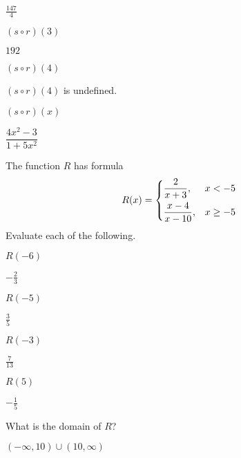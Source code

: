 \begin{exercises}
\begin{problem}[Composition]
\begin{multicols}{3}
\begin{subproblem}
\begin{shortsolution}
			$\frac{147}{4}$ 
		\end{shortsolution}
	\end{subproblem}
	\begin{subproblem}
		$(s\circ r)(3)$ 
		\begin{shortsolution}
			$192$ 
		\end{shortsolution}
	\end{subproblem}
	\begin{subproblem}
		$(s\circ r)(4)$ 
		\begin{shortsolution}
			$(s\circ r)(4)$ is undefined.
		\end{shortsolution}
	\end{subproblem}
	\begin{subproblem}
		$(s\circ r)(x)$ 
		\begin{shortsolution}
			$\dfrac{4x^2-3}{1+5x^2}$
		\end{shortsolution}
	\end{subproblem}
\end{multicols}
\end{problem}
\begin{problem}
The function $R$ has formula
\[
	R(x)=
	\begin{dcases}
		\frac{2}{x+3},    & x<-5     \\
		\frac{x-4}{x-10}, & x\geq -5 
	\end{dcases}
\]
Evaluate each of the following.
\begin{multicols}{4}
	\begin{subproblem}
		$R(-6)$    
		\begin{shortsolution}
			$-\frac{2}{3}$ 
		\end{shortsolution}
	\end{subproblem}
	\begin{subproblem}
		$R(-5)$ 
		\begin{shortsolution}
			$\frac{3}{5}$ 
		\end{shortsolution}
	\end{subproblem}
	\begin{subproblem}
		$R(-3)$ 
		\begin{shortsolution}
			$\frac{7}{13}$ 
		\end{shortsolution}
	\end{subproblem}
	\begin{subproblem}
		$R(5)$ 
		\begin{shortsolution}
			$-\frac{1}{5}$ 
		\end{shortsolution}
	\end{subproblem}
\end{multicols}
\begin{subproblem}
	What is the domain of $R$? 
	\begin{shortsolution}
		$(-\infty,10)\cup(10,\infty)$ 
	\end{shortsolution}
\end{subproblem}
\end{problem}
\end{exercises}

